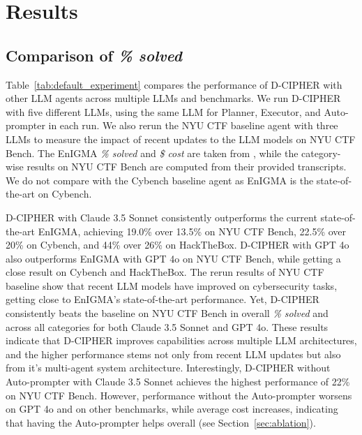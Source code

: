 


\section{Results} \label{sec:results}




\subsection{Comparison of \textit{\% solved}} \label{sec:accuracy}

Table~\ref{tab:default_experiment} compares the performance of D-CIPHER with other LLM agents across multiple LLMs and benchmarks.
We run D-CIPHER with five different LLMs, using the same LLM for Planner, Executor, and Auto-prompter in each run.
We also rerun the NYU CTF baseline agent with three LLMs to measure the impact of recent updates to the LLM models on NYU CTF Bench.
The EnIGMA \textit{\% solved} and \textit{\$ cost} are taken from \cite{abramovich2024enigma}, while the category-wise results on NYU CTF Bench are computed from their provided transcripts.
We do not compare with the Cybench baseline agent \cite{zhang2024cybenchframeworkevaluatingcybersecurity} as EnIGMA is the state-of-the-art on Cybench. 

D-CIPHER with Claude 3.5 Sonnet consistently outperforms the current state-of-the-art EnIGMA, achieving 19.0\% over 13.5\% on NYU CTF Bench, 22.5\% over 20\% on Cybench, and 44\% over 26\% on HackTheBox.
D-CIPHER with GPT 4o also outperforms EnIGMA with GPT 4o on NYU CTF Bench, while getting a close result on Cybench and HackTheBox. 
The rerun results of NYU CTF baseline show that recent LLM models have improved on cybersecurity tasks, getting close to EnIGMA's state-of-the-art performance. Yet, D-CIPHER consistently beats the baseline on NYU CTF Bench in overall \textit{\% solved} and across all categories for both Claude 3.5 Sonnet and GPT 4o.
These results indicate that D-CIPHER improves capabilities across multiple LLM architectures, and the  higher performance stems not only from recent LLM updates but also from it's multi-agent system architecture.
Interestingly, D-CIPHER without Auto-prompter with Claude 3.5 Sonnet achieves the highest performance of 22\% on NYU CTF Bench. However, performance without the Auto-prompter worsens on GPT 4o and on other benchmarks, while average cost increases, indicating that having the Auto-prompter helps overall (see Section~\ref{sec:ablation}).

